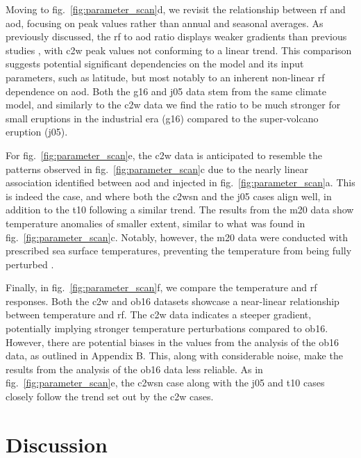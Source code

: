 \documentclass{ametsocV6.1}
\newcommand{\iso}[1][i]{{#1}njected \ce{SO2}}
\begin{document}
Moving to fig.~\ref{fig:parameter_scan}d, we revisit the relationship between \gls{rf}
and \gls{aod}, focusing on peak values rather than annual and seasonal averages. As
previously discussed, the \gls{rf} to \gls{aod} ratio displays weaker gradients than
previous studies \citep{jones2005, marshall2020, timmreck2010}, with \gls{c2w} peak
values not conforming to a linear trend. This comparison suggests potential significant
dependencies on the model and its input parameters, such as latitude, but most notably
to an inherent non-linear \gls{rf} dependence on \gls{aod}. Both the \gls{g16} and
\gls{j05} data stem from the same climate model, and similarly to the \gls{c2w} data we
find the ratio to be much stronger for small eruptions in the industrial era (\gls{g16})
compared to the super-volcano eruption (\gls{j05}).

For fig.~\ref{fig:parameter_scan}e, the \gls{c2w} data is anticipated to resemble the
patterns observed in fig.~\ref{fig:parameter_scan}c due to the nearly linear association
identified between \gls{aod} and \iso{} in fig.~\ref{fig:parameter_scan}a. This is
indeed the case, and where both the \gls{c2wsn} and the \gls{j05} cases align well, in
addition to the \gls{t10} following a similar trend. The results from the \gls{m20} data
show temperature anomalies of smaller extent, similar to what was found in
fig.~\ref{fig:parameter_scan}c. Notably, however, the \gls{m20} data were conducted with
prescribed sea surface temperatures, preventing the temperature from being fully
perturbed \citet{marshall2020}.

Finally, in fig.~\ref{fig:parameter_scan}f, we compare the temperature and \gls{rf}
responses. Both the \gls{c2w} and \gls{ob16} datasets showcase a near-linear
relationship between temperature and \gls{rf}. The \gls{c2w} data indicates a steeper
gradient, potentially implying stronger temperature perturbations compared to
\gls{ob16}. However, there are potential biases in the values from the analysis of the
\gls{ob16} data, as outlined in Appendix B. This, along with considerable noise, make
the results from the analysis of the \gls{ob16} data less reliable. As in
fig.~\ref{fig:parameter_scan}e, the \gls{c2wsn} case along with the \gls{j05} and
\gls{t10} cases closely follow the trend set out by the \gls{c2w} cases.

\section{Discussion}\label{sec:discussion}
\end{document}
